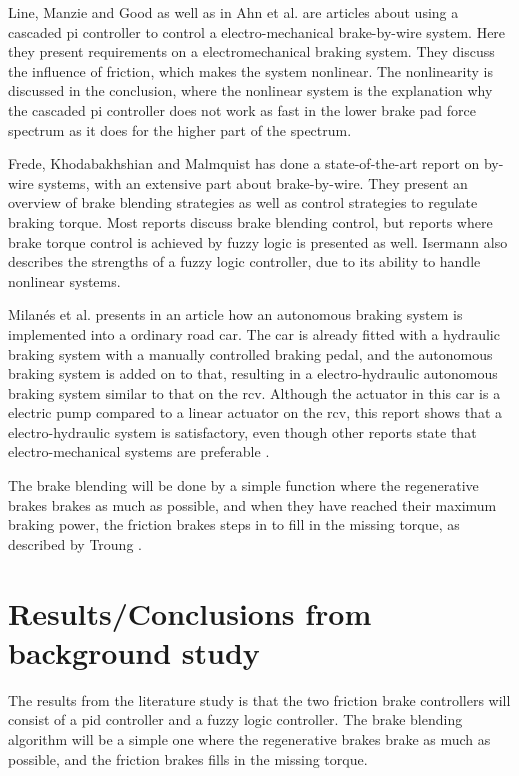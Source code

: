 \documentclass[a4paper,11pt]{kth-mag}
\begin{document}
Line, Manzie and Good \cite{2004-01-2050} as well as in Ahn et al. \cite{ahn2009analysis} are articles about using a cascaded \gls{pi} controller to control a electro-mechanical brake-by-wire system. Here they present requirements on a electromechanical braking system. They discuss the influence of friction, which makes the system nonlinear. The nonlinearity is discussed in the conclusion, where the nonlinear system is the explanation why the cascaded pi controller does not work as fast in the lower brake pad force spectrum as it does for the higher part of the spectrum. \newline



Frede, Khodabakhshian and Malmquist \cite{Frede460614} has done a state-of-the-art report on by-wire systems, with an extensive part about brake-by-wire. They present an overview of brake blending strategies as well as control strategies to regulate braking torque. Most reports discuss brake blending control, but reports where  brake torque control is achieved by fuzzy logic is presented as well. Isermann \cite{661149} also describes the strengths of a fuzzy logic controller, due to its ability to handle nonlinear systems. \newline

Milan{\'e}s et al. \cite{milanes2010electro} presents in an article how an autonomous braking system is implemented into a ordinary road car. The car is already fitted with a hydraulic braking system with a manually controlled braking pedal, and the autonomous braking system is added on to that, resulting in a electro-hydraulic autonomous braking system similar to that on the \gls{rcv}. 
Although the actuator in this car is a electric pump compared to a linear actuator on the \gls{rcv}, this report shows that a electro-hydraulic system is satisfactory, even though other reports state that electro-mechanical systems are preferable \cite{MechatronicsBook} \cite{Xiang}. \newline

The brake blending will be done by a simple function where the regenerative brakes brakes as much as possible, and when they have reached their maximum braking power, the friction brakes steps in to fill in the missing torque, as described by Troung \cite{truongdevelopment}. \newline


\section{Results/Conclusions from background study}
The results from the literature study is that the two friction brake controllers will consist of a \gls{pid} controller and a fuzzy logic controller. 
The brake blending algorithm will be a simple one where the regenerative brakes brake as much as possible, and the friction brakes fills in the missing torque. 
\end{document}
